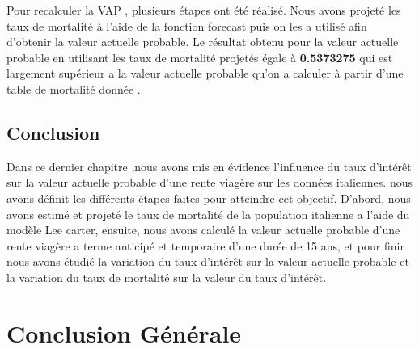 \documentclass[french]{report}
\begin{document}
Pour recalculer la VAP , plusieurs étapes ont été réalisé. Nous 
avons projeté les taux de mortalité à l’aide de la fonction forecast puis on les a utilisé afin d’obtenir la valeur actuelle probable.
\newline
\newline
\newline
Le résultat obtenu pour la valeur actuelle probable  en utilisant les taux de mortalité projetés égale à \textbf{0.5373275 } qui est largement supérieur a la valeur actuelle probable qu'on a calculer à partir d'une table de mortalité donnée .
\newline
 



\section{Conclusion}
Dans ce dernier chapitre
,nous avons mis en évidence l’influence du taux d’intérêt sur la valeur actuelle probable d’une rente viagère sur les données italiennes.
nous avons définit les différents étapes faites pour atteindre cet objectif.
D'abord, nous avons estimé et projeté le taux de mortalité de la population italienne a l’aide du modèle Lee carter,
ensuite, nous avons calculé la valeur actuelle probable d'une rente viagère a terme anticipé et temporaire  d’une durée de 15 ans, et pour finir nous avons
étudié la variation du taux d’intérêt sur la valeur actuelle probable
et la variation du taux de mortalité sur la valeur du taux d’intérêt.


\chapter*{Conclusion Générale} 
\end{document}
